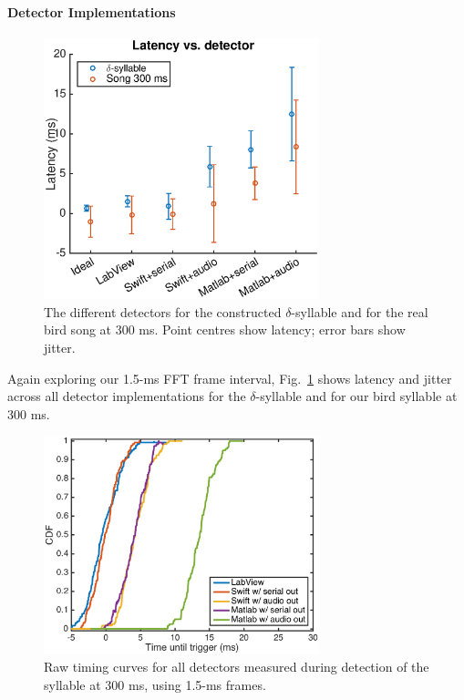 \documentclass[10pt,letterpaper]{article}
\newcommand\fig[1]{Fig.~\ref{#1}}
\renewcommand{\subsubsection}[1]{\paragraph{#1}}
\begin{document}
\subsubsection{Detector Implementations}

\begin{figure}
  \begin{center}
    \includegraphics[width=8cm]{TimingVsDetector}
  \end{center}
  \caption{The different detectors for the constructed $\delta$-syllable and for the real bird song at 300 ms.  Point centres show latency; error bars show jitter.}
  \label{fig:TimingVsDetector}
\end{figure}

Again exploring our 1.5-ms FFT frame interval, \fig{fig:TimingVsDetector} shows latency and jitter across all detector implementations for the $\delta$-syllable and for our bird syllable at 300 ms.

\begin{figure}
  \begin{center}
    \includegraphics[width=8cm]{timing}
  \end{center}
  \caption{Raw timing curves for all detectors measured during detection of the syllable at 300 ms, using 1.5-ms frames.}
  \label{fig:timing}
\end{figure}
\end{document}
